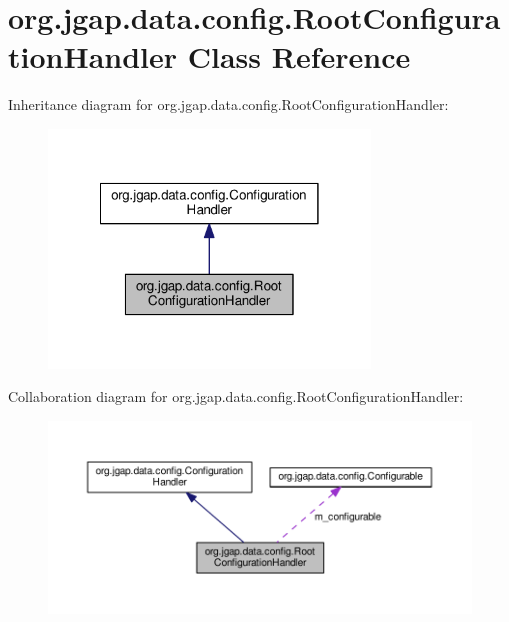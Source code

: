 \hypertarget{classorg_1_1jgap_1_1data_1_1config_1_1_root_configuration_handler}{\section{org.\-jgap.\-data.\-config.\-Root\-Configuration\-Handler Class Reference}
\label{classorg_1_1jgap_1_1data_1_1config_1_1_root_configuration_handler}
}


Inheritance diagram for org.\-jgap.\-data.\-config.\-Root\-Configuration\-Handler\-:
\nopagebreak
\begin{figure}[H]
\begin{center}
\leavevmode
\includegraphics[width=242pt]{classorg_1_1jgap_1_1data_1_1config_1_1_root_configuration_handler__inherit__graph}
\end{center}
\end{figure}


Collaboration diagram for org.\-jgap.\-data.\-config.\-Root\-Configuration\-Handler\-:
\nopagebreak
\begin{figure}[H]
\begin{center}
\leavevmode
\includegraphics[width=350pt]{classorg_1_1jgap_1_1data_1_1config_1_1_root_configuration_handler__coll__graph}
\end{center}
\end{figure}
